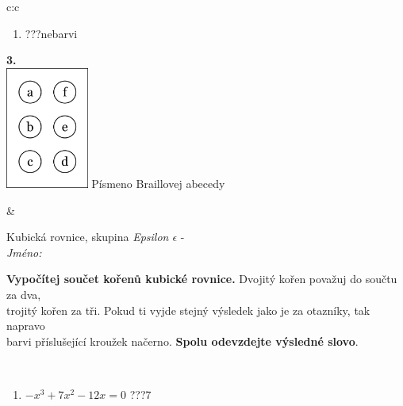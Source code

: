 \documentclass[10pt]{report}
\begin{document}
\begin{tabular}{c:c}
\begin{minipage}[c][104.5mm][t]{0.5\linewidth}
\begin{center}
\begin{minipage}{0.79\linewidth}
\begin{center}
\begin{varwidth}{\linewidth}
\begin{enumerate}
\item \quad \dotfill\; ???\;\dotfill \quad nebarvi
\end{enumerate}
\end{varwidth}
\end{center}
\end{minipage}
\begin{minipage}{0.20\linewidth}
\begin{center}
{\Huge\bfseries 3.} \\[2mm]
\includegraphics[height=40mm]{../images/braille.png}
{\small Písmeno Braillovej abecedy}
\end{center}
\end{minipage}
\end{center}
\end{minipage}
&
\begin{minipage}[c][104.5mm][t]{0.5\linewidth}
\begin{center}
\vspace{7mm}
{\huge Kubická rovnice, skupina \textit{Epsilon $\epsilon$} -}\\[5mm]
\textit{Jméno:}\phantom{xxxxxxxxxxxxxxxxxxxxxxxxxxxxxxxxxxxxxxxxxxxxxxxxxxxxxxxxxxxxxxxxx}\\[5mm]
\begin{minipage}{0.95\linewidth}
\begin{center}
\textbf{Vypočítej součet kořenů kubické rovnice.} Dvojitý kořen považuj do součtu za dva,\\trojitý kořen za tři. Pokud ti vyjde stejný výsledek jako je za otazníky, tak napravo\\barvi příslušející kroužek načerno. \textbf{Spolu odevzdejte výsledné slovo}.
\end{center}
\end{minipage}
\\[1mm]
\begin{minipage}{0.79\linewidth}
\begin{center}
\begin{varwidth}{\linewidth}
\begin{enumerate}
\Large
\item $-x^3+7x^2-12x=0$\quad \dotfill\; ???\;\dotfill \quad $7$

\end{enumerate}
\end{varwidth}
\end{center}
\end{minipage}
\end{center}
\end{minipage}
\end{tabular}
\end{document}
